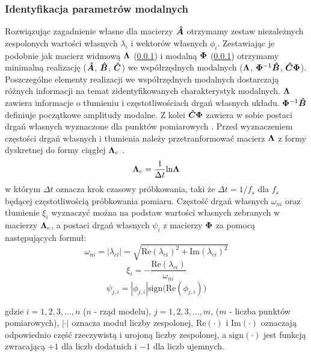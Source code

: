 \subsubsection{Identyfikacja parametrów modalnych}
Rozwiązując zagadnienie własne dla macierzy $\bm{\hat{A}}$ otrzymamy zestaw niezależnych zespolonych wartości własnych $\lambda_i$ i wektorów własnych $\phi_i$. Zestawiając je podobnie jak macierz widmową $\bm{\Lambda}$ (\ref{}) i modalną $\bm{\Phi}$ (\ref{}) otrzymamy minimalną realizację ($\bm{\hat{A}}$, $\bm{\hat{B}}$, $\bm{\hat{C}}$) we współrzędnych modalnych ($\bm{\Lambda}$, $\bm{\Phi}^{-1}\bm{\hat{B}}$, $\bm{\hat{C}}\bm{\Phi}$). Poszczególne elementy realizacji we współrzędnych modalnych dostarczają różnych informacji na temat zidentyfikowanych charakterystyk modalnych. $\bm{\Lambda}$ zawiera informacje o tłumieniu i częstotliwościach drgań własnych układu. $\bm{\Phi}^{-1}\bm{\hat{B}}$ definiuje początkowe amplitudy modalne. Z kolei $\bm{\hat{C}}\bm{\Phi}$ zawiera w sobie postaci drgań własnych wyznaczone dla punktów pomiarowych \parencite{Li2011}.
Przed wyznaczeniem częstości drgań własnych i tłumienia należy przetranformować macierz $\bm{\Lambda}$ z formy dyskretnej do formy ciągłej $\bm{\Lambda}_c$ \parencite{Szafranski2013}.
\begin{equation}
	\bm{\Lambda}_c = \frac{1}{\Delta t} \text{ln}\bm{\Lambda}
\end{equation} 
w którym $\Delta t$ oznacza krok czasowy próbkowania, taki że $\Delta t = 1/f_s$ dla $f_s$ będącej częstotliwością próbkowania pomiaru. Częstość drgań własnych $\omega_{ni}$ oraz tłumienie $\xi_i$ wyznaczyć można na podstaw wartości własnych zebranych w macierzy $\bm{\Lambda}_c$, a postaci drgań własnych $\psi_i$ z macierzy $\bm{\Phi}$ za pomocą następujących formuł:
\begin{equation}
	\omega_{ni} = |\lambda_{ci}|= \sqrt{\text{Re}(\lambda_{ci})^2+\text{Im}(\lambda_{ci})^2}
\end{equation}
\begin{equation}
	\xi_{i} = -\frac{\text{Re}(\lambda_{ci})}{\omega_{ni}} 
\end{equation}
\begin{equation}
	\psi_{j,i} = |\phi_{j,i}|\text{sign}\Big(\text{Re}(\phi_{j,i})\Big)
\end{equation}

gdzie $i=1,2,3,\dots,n$ ($n$ - rząd modelu), $j=1,2,3,\dots,m$, ($m$ - liczba punktów pomiarowych), $|\cdot|$ oznacza moduł liczby zespolonej, $\text{Re}(\cdot)$ i $\text{Im}(\cdot)$ oznaczają odpowiednio część rzeczywistą i urojoną liczby zespolonej, a $\text{sign}(\cdot)$ jest funkcją zwracającą $+1$ dla liczb dodatnich i $-1$ dla liczb ujemnych.

